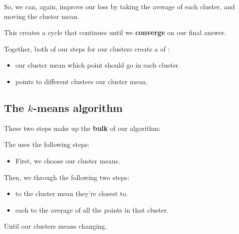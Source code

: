        So, we can, again, improve our loss by taking the average of each cluster, and moving the cluster mean.
        
        This creates a cycle that continues until we \textbf{converge} on our final answer.\\
        
        \begin{concept}
            Together, both of our steps for  our clusters create a  of :
            
            \begin{itemize}
                \item {} our cluster mean  which point should go in each cluster.
                
                \item {} points to different clusters  our cluster mean.
            \end{itemize}
        \end{concept}
        
    \subsection{The $k$-means algorithm}
    
        These two steps make up the \textbf{bulk} of our algorithm:\\
        
        \begin{definition}
            The  uses the following steps:
            
            \begin{itemize}
                \item First, we  choose our  cluster means.
            \end{itemize} 
            
            Then, we  through the following two steps:
            
            \begin{itemize}
                \item {}  to the cluster mean they're closest to.
                
                \item {} each  to the average of all the points in that cluster.
            \end{itemize}
            
            Until our clusters means  changing.
        \end{definition}
        
